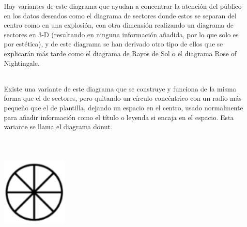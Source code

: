 \documentclass{article}\usepackage[]{graphicx}\usepackage[]{color}
\begin{document}
Hay variantes de este diagrama que ayudan a concentrar la atenci\'on del p\'ublico en los datos deseados como el diagrama de sectores donde estos se separan del centro como en una explosi\'on\cite{pie-explode}, con otra dimensi\'on realizando un diagrama de sectores en 3-D (resultando en ninguna informaci\'on a\~nadida, por lo que solo es por est\'etica), y de este diagrama se han derivado otro tipo de ellos que se explicar\'an m\'as tarde como el diagrama de Rayos de Sol o el diagrama Rose of Nightingale.~\\~\par
Existe una variante de este diagrama que se construye y funciona de la misma forma que el de sectores, pero quitando un c\'irculo conc\'entrico con un radio m\'as peque\~no que el de plantilla, dejando un espacio en el centro, usado normalmente para a\~nadir informaci\'on como el t\'itulo o leyenda si encaja en el espacio. Esta variante se llama el diagrama donut.
~\\~\\~\\~\\
\vbox{
    \centering
    \includegraphics[width=0.25\textwidth]{imag/sectores}
}
\clearpage
\end{document}
